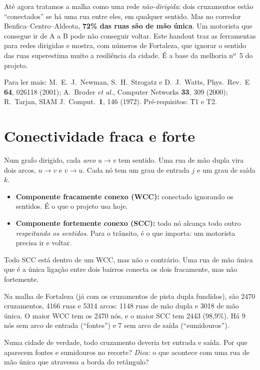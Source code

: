 \documentclass[11pt]{article}
\begin{document}
\fazertitulo

Até agora tratamos a malha como uma rede \emph{não-dirigida}: dois cruzamentos estão ``conectados'' se há uma rua entre eles, em qualquer sentido. Mas no corredor Benfica--Centro--Aldeota, \textbf{72\% das ruas são de mão única}. Um motorista que consegue ir de A a B pode não conseguir voltar. Este handout traz as ferramentas para redes dirigidas e mostra, com números de Fortaleza, que ignorar o sentido das ruas superestima muito a resiliência da cidade. É a base da melhoria nº~5 do projeto.

Para ler mais: M.~E.~J.~Newman, S.~H.~Strogatz e D.~J.~Watts, Phys.\ Rev.\ E \textbf{64}, 026118 (2001); A.~Broder \emph{et al.}, Computer Networks \textbf{33}, 309 (2000); R.~Tarjan, SIAM J.\ Comput.\ \textbf{1}, 146 (1972). Pré-requisitos: T1 e T2. 

\section{Conectividade fraca e forte}

Num grafo dirigido, cada \emph{arco} $u\to v$ tem sentido. Uma rua de mão dupla vira dois arcos, $u\to v$ e $v\to u$. Cada nó tem um grau de entrada $j$ e um grau de saída $k$.

\begin{ideia}
\begin{itemize}
  \item \textbf{Componente fracamente conexo (WCC):} conectado ignorando os sentidos. É o que o projeto usa hoje.
  \item \textbf{Componente fortemente conexo (SCC):} todo nó alcança todo outro \emph{respeitando os sentidos}. Para o trânsito, é o que importa: um motorista precisa ir e voltar.
\end{itemize}
Todo SCC está dentro de um WCC, mas não o contrário. Uma rua de mão única que é a única ligação entre dois bairros conecta os dois fracamente, mas não fortemente.
\end{ideia}

Na malha de Fortaleza (já com os cruzamentos de pista dupla fundidos), são 2470 cruzamentos, 4166 ruas e 5314 arcos: 1148 ruas de mão dupla e 3018 de mão única. O maior WCC tem os 2470 nós, e o maior SCC tem 2443 (98,9\%). Há 9 nós sem arco de entrada (``fontes'') e 7 sem arco de saída (``sumidouros'').

 Numa cidade de verdade, todo cruzamento deveria ter entrada e saída. Por que aparecem fontes e sumidouros no recorte? \emph{Dica:} o que acontece com uma rua de mão única que atravessa a borda do retângulo?
\end{document}
